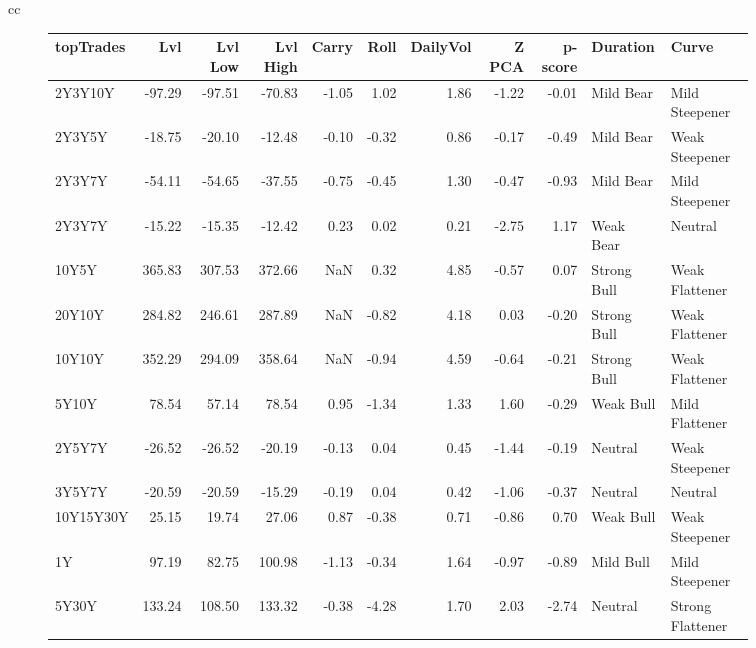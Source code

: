 \documentclass[a4paper,oneside]{report}
\begin{document}
\begin{figure}[htbp]
\begin{tabular}[c]{cc}
\begin{subfigure}[c]{0.5\textwidth}
\begin{adjustbox}{max width=\textwidth}
\begin{tabular}{lrrrrrrrrll}
\hline
 topTrades &     Lvl &  Lvl Low &  Lvl High &  Carry &  Roll &  DailyVol &  Z PCA &  p-score &     Duration &             Curve \\
\hline
   2Y3Y10Y &  -97.29 &   -97.51 &    -70.83 &  -1.05 &  1.02 &      1.86 &  -1.22 &    -0.01 &    Mild Bear &    Mild Steepener \\
   2Y3Y5Y &  -18.75 &   -20.10 &    -12.48 &  -0.10 & -0.32 &      0.86 &  -0.17 &    -0.49 &    Mild Bear &    Weak Steepener \\
   2Y3Y7Y &  -54.11 &   -54.65 &    -37.55 &  -0.75 & -0.45 &      1.30 &  -0.47 &    -0.93 &    Mild Bear &    Mild Steepener \\
   2Y3Y7Y &  -15.22 &   -15.35 &    -12.42 &   0.23 &  0.02 &      0.21 &  -2.75 &     1.17 &    Weak Bear &           Neutral \\
   10Y5Y &  365.83 &   307.53 &    372.66 &    NaN &  0.32 &      4.85 &  -0.57 &     0.07 &  Strong Bull &    Weak Flattener \\
   20Y10Y &  284.82 &   246.61 &    287.89 &    NaN & -0.82 &      4.18 &   0.03 &    -0.20 &  Strong Bull &    Weak Flattener \\
   10Y10Y &  352.29 &   294.09 &    358.64 &    NaN & -0.94 &      4.59 &  -0.64 &    -0.21 &  Strong Bull &    Weak Flattener \\
   5Y10Y &   78.54 &    57.14 &     78.54 &   0.95 & -1.34 &      1.33 &   1.60 &    -0.29 &    Weak Bull &    Mild Flattener \\
   2Y5Y7Y &  -26.52 &   -26.52 &    -20.19 &  -0.13 &  0.04 &      0.45 &  -1.44 &    -0.19 &      Neutral &    Weak Steepener \\
   3Y5Y7Y &  -20.59 &   -20.59 &    -15.29 &  -0.19 &  0.04 &      0.42 &  -1.06 &    -0.37 &      Neutral &           Neutral \\
   10Y15Y30Y &   25.15 &    19.74 &     27.06 &   0.87 & -0.38 &      0.71 &  -0.86 &     0.70 &    Weak Bull &    Weak Steepener \\
   1Y &   97.19 &    82.75 &    100.98 &  -1.13 & -0.34 &      1.64 &  -0.97 &    -0.89 &    Mild Bull &    Mild Steepener \\
   5Y30Y &  133.24 &   108.50 &    133.32 &  -0.38 & -4.28 &      1.70 &   2.03 &    -2.74 &      Neutral &  Strong Flattener \\

\end{tabular}
\end{adjustbox}
\end{subfigure}
\end{tabular}
\end{figure}
\end{document}
